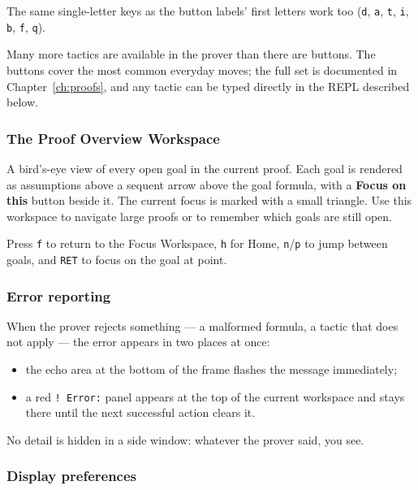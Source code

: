 \noindent
The same single-letter keys as the button labels' first letters
work too (\texttt{d}, \texttt{a}, \texttt{t}, \texttt{i},
\texttt{b}, \texttt{f}, \texttt{q}).

\begin{remark}
Many more tactics are available in the prover than there are
buttons.  The buttons cover the most common everyday moves; the
full set is documented in Chapter~\ref{ch:proofs}, and any
tactic can be typed directly in the REPL described below.
\end{remark}

\subsubsection{The Proof Overview Workspace}

A bird's-eye view of every open goal in the current proof.  Each
goal is rendered as assumptions above a sequent arrow above the
goal formula, with a \textbf{Focus on this} button beside it.
The current focus is marked with a small triangle.  Use this
workspace to navigate large proofs or to remember which goals are
still open.

Press \texttt{f} to return to the Focus Workspace, \texttt{h} for
Home, \texttt{n}/\texttt{p} to jump between goals, and
\texttt{RET} to focus on the goal at point.

\subsubsection{Error reporting}

When the prover rejects something --- a malformed formula, a tactic
that does not apply --- the error appears in two places at once:

\begin{itemize}
\item the echo area at the bottom of the frame flashes the message
  immediately;
\item a red \texttt{! Error:} panel appears at the top of the
  current workspace and stays there until the next successful
  action clears it.
\end{itemize}

\noindent
No detail is hidden in a side window: whatever the prover said,
you see.

\subsubsection{Display preferences}

